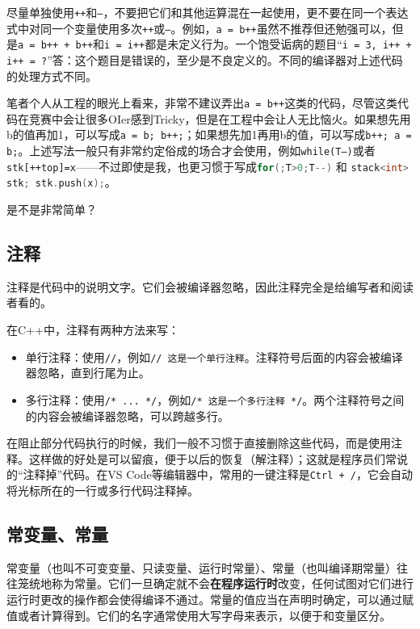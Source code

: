\documentclass[../main.tex]{subfiles}
\begin{document}
\begin{caution}
  尽量单独使用\texttt{++}和\texttt{--}，不要把它们和其他运算混在一起使用，更不要在同一个表达式中对同一个变量使用多次\texttt{++}或\texttt{--}。例如，\texttt{a = b++}虽然不推荐但还勉强可以，但是\texttt{a = b++ + b++}和\texttt{i = i++}都是未定义行为。一个饱受诟病的题目“\texttt{i = 3, i++ + i++ = ?}”答：这个题目是错误的，至少是不良定义的。不同的编译器对上述代码的处理方式不同。

  笔者个人从工程的眼光上看来，非常不建议弄出\texttt{a = b++}这类的代码，尽管这类代码在竞赛中会让很多OIer感到Tricky，但是在工程中会让人无比恼火。如果想先用b的值再加1，可以写成\texttt{a = b; b++;}；如果想先加1再用b的值，可以写成\texttt{b++; a = b;}。上述写法一般只有非常约定俗成的场合才会使用，例如\texttt{while(T--)}或者\texttt{stk[++top]=x}——不过即使是我，也更习惯于写成\lstinline[language=C++]|for(;T>0;T--)| 和 \lstinline[language=C++]|stack<int> stk; stk.push(x);|。
\end{caution}

是不是非常简单？

\subsection{注释}

注释是代码中的说明文字。它们会被编译器忽略，因此注释完全是给编写者和阅读者看的。

在C++中，注释有两种方法来写：
\begin{itemize}
  \item 单行注释：使用\texttt{//}，例如\texttt{// 这是一个单行注释}。注释符号后面的内容会被编译器忽略，直到行尾为止。
  \item 多行注释：使用\texttt{/* ... */}，例如\texttt{/* 这是一个多行注释 */}。两个注释符号之间的内容会被编译器忽略，可以跨越多行。
\end{itemize}

在阻止部分代码执行的时候，我们一般不习惯于直接删除这些代码，而是使用注释。这样做的好处是可以留痕，便于以后的恢复（解注释）；这就是程序员们常说的“注释掉”代码。在VS Code等编辑器中，常用的一键注释是\texttt{Ctrl + /}，它会自动将光标所在的一行或多行代码注释掉。

\subsection{常变量、常量}
常变量（也叫不可变变量、只读变量、运行时常量）、常量（也叫编译期常量）往往笼统地称为常量。它们一旦确定就不会\textbf{在程序运行时}改变，任何试图对它们进行运行时更改的操作都会使得编译不通过。常量的值应当在声明时确定，可以通过赋值或者计算得到。它们的名字通常使用大写字母来表示，以便于和变量区分。
\end{document}
